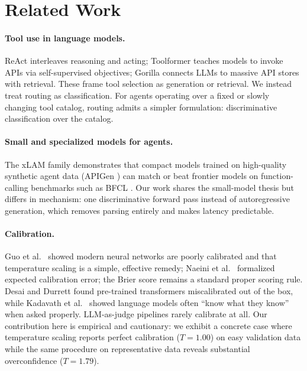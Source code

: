 \documentclass{article}
\begin{document}
\section{Related Work}
\label{sec:related}

\paragraph{Tool use in language models.}
ReAct \citep{yao2023react} interleaves reasoning and acting; Toolformer
\citep{schick2023toolformer} teaches models to invoke APIs via self-supervised
objectives; Gorilla \citep{patil2023gorilla} connects LLMs to massive API
stores with retrieval. These frame tool selection as generation or
retrieval. We instead treat routing as classification. For agents operating
over a fixed or slowly changing tool catalog, routing admits a simpler
formulation: discriminative classification over the catalog.

\paragraph{Small and specialized models for agents.}
The xLAM family \citep{zhang2024xlam} demonstrates that compact models
trained on high-quality synthetic agent data (APIGen \citep{liu2024apigen})
can match or beat frontier models on function-calling benchmarks such as
BFCL \citep{bfcl2024}. Our work shares the small-model thesis but differs in
mechanism: one discriminative forward pass instead of autoregressive
generation, which removes parsing entirely and makes latency predictable.

\paragraph{Calibration.}
Guo et al.\ \citep{guo2017calibration} showed modern neural networks are
poorly calibrated and that temperature scaling is a simple, effective remedy;
Naeini et al.\ \citep{naeini2015obtaining} formalized expected calibration
error; the Brier score \citep{brier1950verification} remains a standard
proper scoring rule. Desai and Durrett \citep{desai2020calibration} found
pre-trained transformers miscalibrated out of the box, while Kadavath et
al.\ \citep{kadavath2022mostly} showed language models often ``know what they
know'' when asked properly. LLM-as-judge pipelines \citep{zheng2023judge}
rarely calibrate at all. Our contribution here is empirical and cautionary:
we exhibit a concrete case where temperature scaling reports perfect
calibration ($T=1.00$) on easy validation data while the same procedure on
representative data reveals substantial overconfidence ($T=1.79$).
\end{document}
